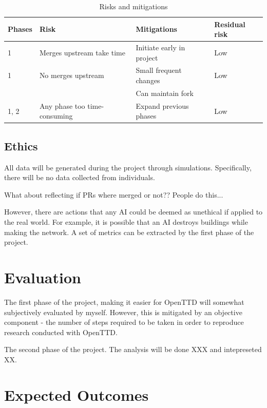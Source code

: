 \documentclass[a4paper,11pt]{article}
\begin{document}
\begin{table}[htbp]
    \begin{center}
        \begin{tabular}{|l|l|l|l|}
        \hline
        \textbf{Phases} & \textbf{Risk} & \textbf{Mitigations} & \textbf{Residual risk} \\
        \hline
        1 & Merges upstream take time & Initiate early in project & Low \\
        1 & No merges upstream & Small frequent changes & Low \\
          &                    & Can maintain fork & \\
        1, 2 & Any phase too time-consuming & Expand previous phases & Low \\
        \hline
        \end{tabular} 
    \end{center}
    \caption[Project milestones]{Risks and mitigations}
    \label{fig:risks}
\end{table}

\subsection{Ethics}

All data will be generated during the project through simulations. Specifically, there will be no data collected from individuals.

What about reflecting if PRs where merged or not?? People do this...

However, there are actions that any AI could be deemed as unethical if applied to the real world. For example, it is possible that an AI destroys buildings while making the network. A set of metrics can be extracted by the first phase of the project.

\section{Evaluation}

The first phase of the project, making it easier for OpenTTD will somewhat subjectively evaluated by myself. However, this is mitigated by an objective component - the number of steps required to be taken in order to reproduce research conducted with OpenTTD.

The second phase of the project. The analysis will be done XXX and intepreseted XX.

\section{Expected Outcomes}
\end{document}

